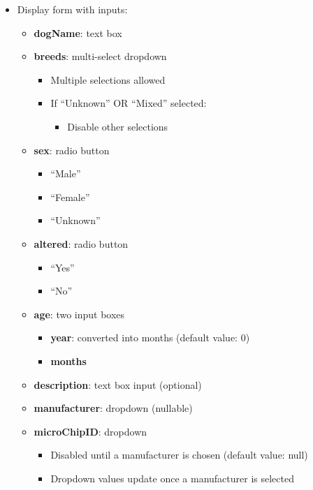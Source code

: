 \documentclass{article}
\begin{document}
\begin{itemize}
    \item Display form with inputs:
    \begin{itemize}
        \item \textbf{dogName}: text box
        \item \textbf{breeds}: multi-select dropdown
        \begin{itemize}
            \item Multiple selections allowed
            \item If ``Unknown'' OR ``Mixed'' selected:
            \begin{itemize}
                \item Disable other selections
            \end{itemize}
        \end{itemize}
        \item \textbf{sex}: radio button
        \begin{itemize}
            \item ``Male''
            \item ``Female''
            \item ``Unknown''
        \end{itemize}
        \item \textbf{altered}: radio button
        \begin{itemize}
            \item ``Yes''
            \item ``No''
        \end{itemize}
        \item \textbf{age}: two input boxes
        \begin{itemize}
            \item \textbf{year}: converted into months (default value: 0)
            \item \textbf{months}
        \end{itemize}
        \item \textbf{description}: text box input (optional)
        \item \textbf{manufacturer}: dropdown (nullable)
        \item \textbf{microChipID}: dropdown
        \begin{itemize}
            \item Disabled until a manufacturer is chosen (default value: null)
            \item Dropdown values update once a manufacturer is selected

\end{itemize}
\end{itemize}
\end{itemize}
\end{document}
